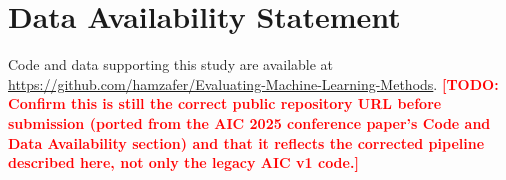\documentclass[11pt,a4paper]{article}
\newcommand{\todonote}[1]{\textcolor{red}{\textbf{[TODO: #1]}}}
\begin{document}
\section*{Data Availability Statement}
Code and data supporting this study are available at
\url{https://github.com/hamzafer/Evaluating-Machine-Learning-Methods}.
\todonote{Confirm this is still the correct public repository URL before
submission (ported from the AIC 2025 conference paper's Code and Data
Availability section) and that it reflects the corrected pipeline described
here, not only the legacy AIC v1 code.}



\end{document}
